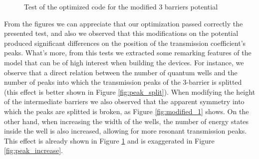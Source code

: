 \documentclass[12pt,a4paper,onecolumn]{article}
\theoremstyle{definition}
\theoremstyle{plain}
\begin{document}
\begin{figure}[H]
\centering
	\caption{Test of the optimized code for the modified 3 barriers potential} 
	\label{fig:modified_2}
\end{figure}	

From the figures we can appreciate that our optimization passed correctly the presented test, and also we observed that this modifications on the potential produced significant differences on the position of the transmission coefficient's peaks. What's more, from this tests we extracted some remarking features of the model that can be of high interest when building the devices. For instance, we observe that a direct relation between the number of quantum wells and the number of peaks into which the transmission peaks of the 3-barrier is splitted (this effect is better shown in Figure \ref {fig:peak_split}). When modifying the height of the intermediate barriers we also observed that the apparent symmetry into which the peaks are splitted is broken, as Figure \ref {fig:modified_1} shows. On the other hand, when increasing the width of the wells, the number of energy states inside the well is also increased, allowing for more resonant transmission peaks. This effect is already shown in Figure \ref {fig:modified_2} and is exaggerated in Figure \ref {fig:peak_increase}.
\end{document}
